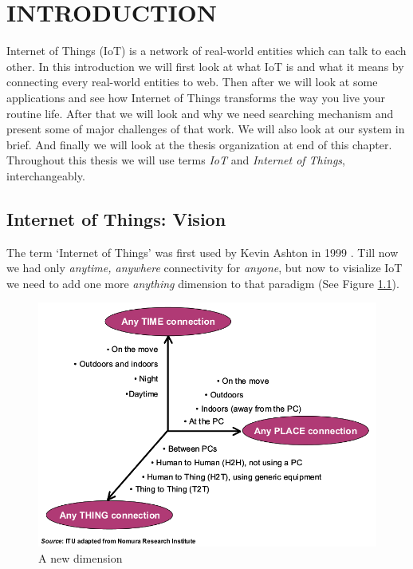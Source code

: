 \documentclass [a4paper,12pt]{book}
\begin{document}
\chapter{INTRODUCTION}
Internet  of Things (IoT) is a network of real-world entities which can talk to each other. In this introduction we will first look at what IoT is and what it means by connecting every real-world entities to web. Then after we will look at some applications and see how Internet of Things transforms the way you live your routine life. After that we will look and why we need searching mechanism and present some of major challenges of that work. We will also look at our system in brief. And finally we will look at the thesis organization at end of this chapter. Throughout this thesis we will use terms \emph{IoT} and {\em Internet of Things}, interchangeably.


\section{Internet of Things: Vision}
The term `Internet of Things' was first used by Kevin Ashton in 1999 \cite{1} . Till now we had only \emph{anytime, anywhere} connectivity for \emph{anyone}, but now to visialize IoT we need to add one more \emph{anything} dimension to that paradigm (See Figure \ref{dimension}).

\vspace{0.5cm}
\begin{figure}[h]
\begin{center}
\includegraphics[scale=0.46]{images/12.png}
\caption{A new dimension}
\label{dimension}
\end{center}
\end{figure}
\end{document}
